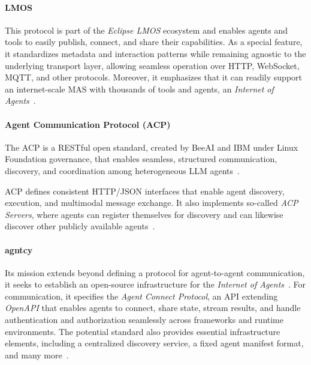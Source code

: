 \documentclass[pdflatex,sn-mathphys-num]{sn-jnl}%
\theoremstyle{thmstyleone}%
\theoremstyle{thmstyletwo}%
\theoremstyle{thmstylethree}%
\begin{document}
\paragraph{LMOS}

This protocol is part of the \textit{Eclipse LMOS} ecosystem and enables agents and tools to easily publish, connect, and share their capabilities. As a special feature, it standardizes metadata and interaction patterns while remaining agnostic to the underlying transport layer, allowing seamless operation over HTTP, WebSocket, MQTT, and other protocols. Moreover, it emphasizes that it can readily support an internet-scale MAS with thousands of tools and agents, an \textit{Internet of Agents}~\cite{lmosgit,lmosdiscovery}.

\paragraph{Agent Communication Protocol (ACP)}

The ACP is a RESTful open standard, created by BeeAI and IBM under Linux Foundation governance, that enables seamless, structured communication, discovery, and coordination among heterogeneous LLM agents~\cite{acpgit,acpcoreconcepts}.

ACP defines consistent HTTP/JSON interfaces that enable agent discovery, execution, and multimodal message exchange. It also implements so-called \textit{ACP Servers}, where agents can register themselves for discovery and can likewise discover other publicly available agents~\cite{acpcoreconcepts}.

\paragraph{agntcy}

Its mission extends beyond defining a protocol for agent-to-agent communication, it seeks to establish an open-source infrastructure for the \textit{Internet of Agents}~\cite{agntcygit}. For communication, it specifies the \textit{Agent Connect Protocol}, an API extending \textit{OpenAPI} that enables agents to connect, share state, stream results, and handle authentication and authorization seamlessly across frameworks and runtime environments. The potential standard also provides essential infrastructure elements, including a centralized discovery service, a fixed agent manifest format, and many more~\cite{agntcyconnectprotocol,agntcyintroduction,agntcydiscovery}.

\end{document}
